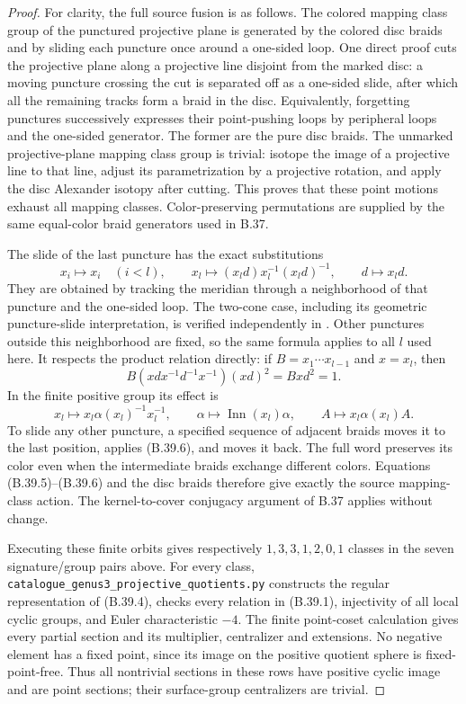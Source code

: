 \begin{proof}
For clarity, the full source fusion is as follows.  The colored
mapping class group of the punctured projective plane is generated
by the colored disc braids and by sliding each puncture once around
a one-sided loop.  One direct proof cuts the projective plane along
a projective line disjoint from the marked disc: a moving puncture
crossing the cut is separated off as a one-sided slide, after which
all the remaining tracks form a braid in the disc.  Equivalently,
forgetting punctures successively expresses their point-pushing
loops by peripheral loops and the one-sided generator.  The former
are the pure disc braids.  The unmarked projective-plane mapping
class group is trivial: isotope the image of a projective line to
that line, adjust its parametrization by a projective rotation, and
apply the disc Alexander isotopy after cutting.  This proves that
these point motions exhaust all mapping classes.  Color-preserving
permutations are supplied by the same equal-color braid generators
used in B.37.

The slide of the last puncture has the exact substitutions
\[
 x_i\longmapsto x_i\quad(i<l),\qquad
 x_l\longmapsto(x_l d)x_l^{-1}(x_l d)^{-1},\qquad
 d\longmapsto x_l d.                                   \tag{B.39.5}
\]
They are obtained by tracking the meridian through a neighborhood
of that puncture and the one-sided loop.  The two-cone case, including
its geometric puncture-slide interpretation, is verified independently
in \cite[Lemma 3.19]{C_GromadzkiSzepietowski2016}.  Other punctures
outside this neighborhood are fixed, so the same formula applies
to all $l$ used here.  It respects the product relation directly:
if $B=x_1\cdots x_{l-1}$ and $x=x_l$, then
\[
 B(x d x^{-1}d^{-1}x^{-1})(x d)^2=B x d^2=1.
\]
In the finite positive group its effect is
\[
 x_l\longmapsto x_l\alpha(x_l)^{-1}x_l^{-1},\qquad
 \alpha\longmapsto\operatorname{Inn}(x_l)\alpha,
 \qquad A\longmapsto x_l\alpha(x_l)A.                  \tag{B.39.6}
\]
To slide any other puncture, a specified sequence of adjacent braids
moves it to the last position, applies (B.39.6), and moves it back.
The full word preserves its color even when the intermediate braids
exchange different colors.  Equations (B.39.5)--(B.39.6) and the disc
braids therefore give exactly the source mapping-class action.
The kernel-to-cover conjugacy argument of B.37 applies without change.

Executing these finite orbits gives respectively $1,3,3,1,2,0,1$
classes in the seven signature/group pairs above.  For every class,
\texttt{catalogue\_genus3\_projective\_quotients.py} constructs the
regular representation of (B.39.4), checks every relation in
(B.39.1), injectivity of all local cyclic groups, and Euler
characteristic $-4$.  The finite point-coset calculation gives every
partial section and its multiplier, centralizer and extensions.
No negative element has a fixed point, since its image on the
positive quotient sphere is fixed-point-free.  Thus all nontrivial
sections in these rows have positive cyclic image and are point
sections; their surface-group centralizers are trivial.


\end{proof}
